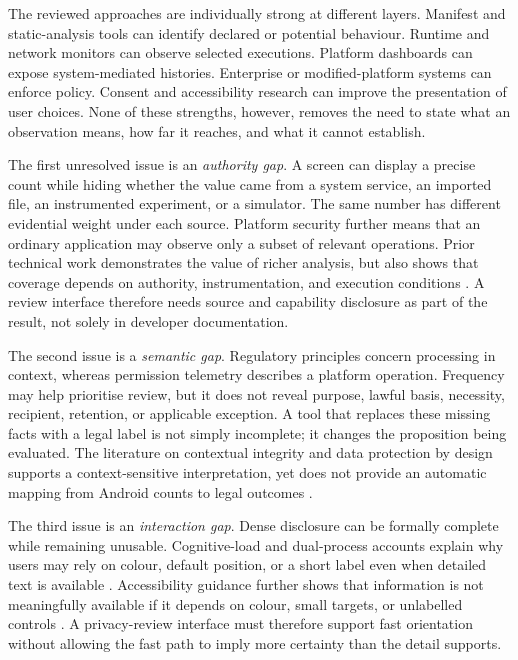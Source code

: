 The reviewed approaches are individually strong at different layers. Manifest and static-analysis tools can identify declared or potential behaviour. Runtime and network monitors can observe selected executions. Platform dashboards can expose system-mediated histories. Enterprise or modified-platform systems can enforce policy. Consent and accessibility research can improve the presentation of user choices. None of these strengths, however, removes the need to state what an observation means, how far it reaches, and what it cannot establish.

The first unresolved issue is an \emph{authority gap}. A screen can display a precise count while hiding whether the value came from a system service, an imported file, an instrumented experiment, or a simulator. The same number has different evidential weight under each source. Platform security further means that an ordinary application may observe only a subset of relevant operations. Prior technical work demonstrates the value of richer analysis, but also shows that coverage depends on authority, instrumentation, and execution conditions \cite{49,androidpermissions2026}. A review interface therefore needs source and capability disclosure as part of the result, not solely in developer documentation.

The second issue is a \emph{semantic gap}. Regulatory principles concern processing in context, whereas permission telemetry describes a platform operation. Frequency may help prioritise review, but it does not reveal purpose, lawful basis, necessity, recipient, retention, or applicable exception. A tool that replaces these missing facts with a legal label is not simply incomplete; it changes the proposition being evaluated. The literature on contextual integrity and data protection by design supports a context-sensitive interpretation, yet does not provide an automatic mapping from Android counts to legal outcomes \cite{5,eurlex2016,edpb2019}.

The third issue is an \emph{interaction gap}. Dense disclosure can be formally complete while remaining unusable. Cognitive-load and dual-process accounts explain why users may rely on colour, default position, or a short label even when detailed text is available \cite{27,22}. Accessibility guidance further shows that information is not meaningfully available if it depends on colour, small targets, or unlabelled controls \cite{wcag22,androidaccess}. A privacy-review interface must therefore support fast orientation without allowing the fast path to imply more certainty than the detail supports.

